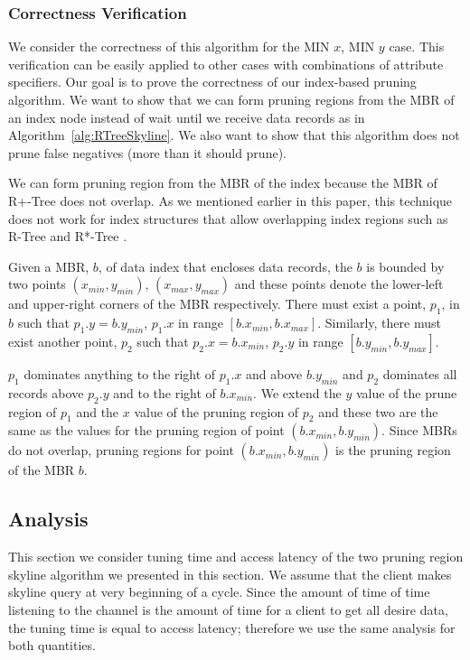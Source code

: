 \documentclass{sig-alternate}
\begin{document}

\subsubsection{Correctness Verification}

We consider the correctness of this algorithm for the MIN $x$,
MIN $y$ case. This verification can be easily applied to other
cases with combinations of attribute specifiers. Our goal is to prove
the correctness of our index-based pruning algorithm. We want to show
that we can form pruning regions from the MBR
of an index node instead of wait until we receive data records as in
Algorithm~\ref{alg:RTreeSkyline}. We also want to show
that this algorithm does not prune false negatives (more than it should prune).

We can form pruning region from the MBR of the index because the MBR
of R+-Tree does not overlap. As we mentioned earlier in this paper,
this technique does not work for index structures that allow overlapping
index regions such as R-Tree and R*-Tree \cite{Beckmann:1990:RER:93597.98741}.

Given a MBR, $b$, of data index that encloses data records, the $b$ is bounded by two points
$(x_{min}, y_{min})$, $(x_{max}, y_{max})$ and these points denote the lower-left and upper-right corners of the
MBR respectively. There must exist a point, $p_1$, in $b$ such that $p_1.y = b.y_{min}$, $p_1.x$ in range
$[b.x_{min}, b.x_{max}]$. Similarly, there must exist another point, $p_2$ such that $p_2.x = b.x_{min}$, $p_2.y$ in range
$[b.y_{min}, b.y_{max}]$.

$p_1$ dominates anything to the right of $p_1.x$ and above $b.y_{min}$ and $p_2$ dominates all records above
$p_2.y$ and to the right of $b.x_{min}$. We extend the $y$ value of the prune region of $p_1$ and the $x$ value
of the pruning region of $p_2$ and these two are the same as the values for the pruning region of point
$(b.x_{min}, b.y_{min})$. Since MBRs do not overlap, pruning regions for point $(b.x_{min}, b.y_{min})$ is the
pruning region of the MBR $b$.

\subsection{Analysis}

This section we consider tuning time and access latency of the two pruning
region skyline algorithm we presented in this section. We assume that the
client makes skyline query at very beginning of a cycle. Since the amount of
time of time listening to the channel is the amount of time for a client to
get all desire data, the tuning time is equal to access latency; therefore
we use the same analysis for both quantities.
\end{document}
